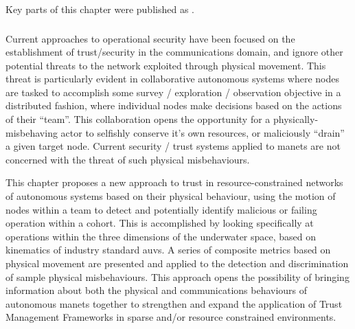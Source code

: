 Key parts of this chapter were published as .

\subsubsection{}

Current approaches to operational security have been focused on the establishment of trust/security in the communications domain, and ignore other potential threats to the network exploited through physical movement.
This threat is particularly evident in collaborative autonomous systems where nodes are tasked to accomplish some survey / exploration / observation objective in a distributed fashion, where individual nodes make decisions based on the actions of their ``team''. 
This collaboration opens the opportunity for a physically-misbehaving actor to selfishly conserve it's own resources, or maliciously ``drain'' a given target node.
Current security / trust systems applied to \glspl{manet} are not concerned with the threat of such physical misbehaviours.

This chapter proposes a new approach to trust in resource-constrained networks of autonomous systems based on their physical behaviour, using the motion of nodes within a team to detect and potentially identify malicious or failing operation within a cohort.
This is accomplished by looking specifically at operations within the three dimensions of the underwater space, based on kinematics of industry standard \glspl{auv}.
A series of composite metrics based on physical movement are presented and applied to the detection and discrimination of sample physical misbehaviours.
This approach opens the possibility of bringing information about both the physical and communications behaviours of autonomous \glspl{manet} together to strengthen and expand the application of Trust Management Frameworks in sparse and/or resource constrained environments.


\subsubsection{}

